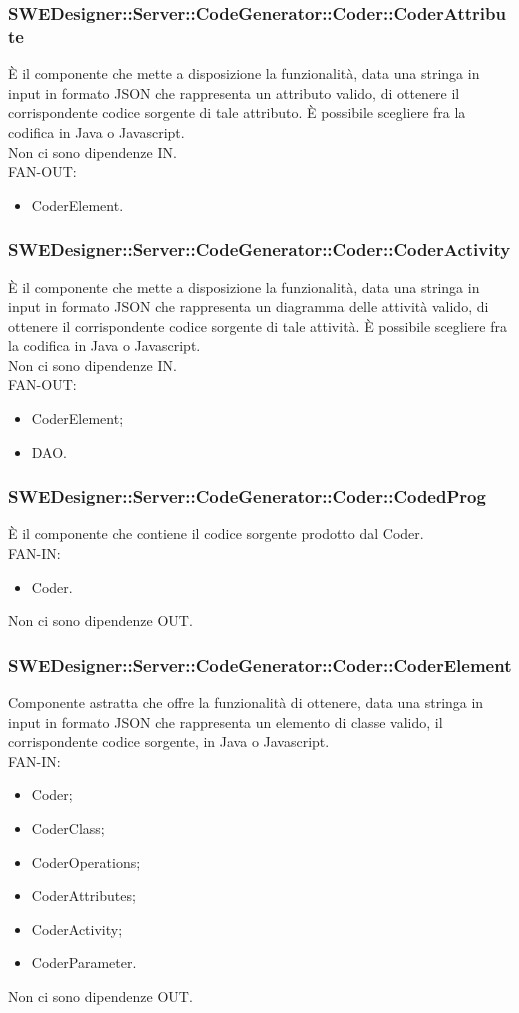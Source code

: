 \documentclass[../PianoDiQualifica.tex]{subfiles}
\begin{document}
			\subsubsection{SWEDesigner::Server::CodeGenerator::Coder::CoderAttribute}
			È il componente che mette a disposizione la funzionalità, data una stringa in input in formato JSON che rappresenta un attributo valido, di ottenere il corrispondente codice sorgente di tale attributo. È possibile scegliere fra la codifica in Java o Javascript.\\
			Non ci sono dipendenze IN.\\
			FAN-OUT:
			\begin{itemize}
				\item CoderElement.
			\end{itemize}
		\subsubsection{SWEDesigner::Server::CodeGenerator::Coder::CoderActivity}
		È il componente che mette a disposizione la funzionalità, data una stringa in input in formato JSON che rappresenta un diagramma delle attività valido, di ottenere il corrispondente codice sorgente di tale attività. È possibile scegliere fra la codifica in Java o Javascript.\\
		Non ci sono dipendenze IN.\\
		FAN-OUT:
		\begin{itemize}
			\item CoderElement;
			\item DAO.
		\end{itemize}
		\subsubsection{SWEDesigner::Server::CodeGenerator::Coder::CodedProg}
		È il componente che contiene il codice sorgente prodotto dal Coder.\\
		FAN-IN:
		\begin{itemize}
			\item Coder.
		\end{itemize}
		Non ci sono dipendenze OUT.
		
		\subsubsection{SWEDesigner::Server::CodeGenerator::Coder::CoderElement}
		Componente astratta che offre la funzionalità di ottenere, data una stringa in input in formato JSON che rappresenta un elemento di classe valido, il corrispondente codice sorgente, in Java o Javascript.\\
		FAN-IN:
		\begin{itemize}
			\item Coder;
			\item CoderClass;
			\item CoderOperations;
			\item CoderAttributes;
			\item CoderActivity;
			\item CoderParameter.
		\end{itemize}
		Non ci sono dipendenze OUT.
\end{document}
